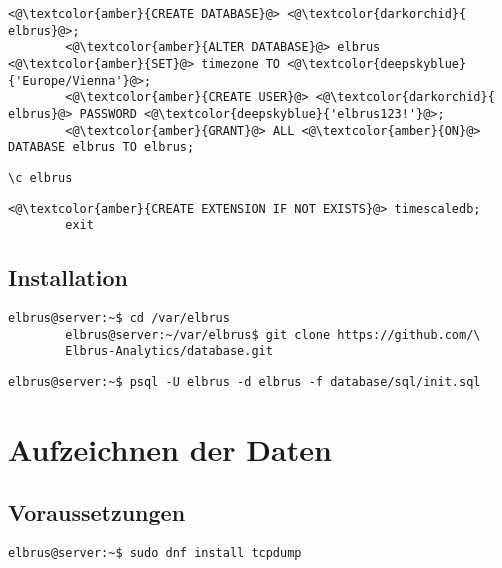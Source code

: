 \documentclass{article}
\begin{document}
	\lstset{style=files}
	\begin{lstlisting}[caption={Auführen von SQL Befehlen.}, numbers=none]
		<@\textcolor{amber}{CREATE DATABASE}@> <@\textcolor{darkorchid}{ elbrus}@>;
		<@\textcolor{amber}{ALTER DATABASE}@> elbrus <@\textcolor{amber}{SET}@> timezone TO <@\textcolor{deepskyblue}{'Europe/Vienna'}@>;
		<@\textcolor{amber}{CREATE USER}@> <@\textcolor{darkorchid}{ elbrus}@> PASSWORD <@\textcolor{deepskyblue}{'elbrus123!'}@>;
		<@\textcolor{amber}{GRANT}@> ALL <@\textcolor{amber}{ON}@> DATABASE elbrus TO elbrus;
	\end{lstlisting}
	
	\begin{lstlisting}[caption={Wechseln zu erstellter Datenbank}, numbers=none]
		\c elbrus
	\end{lstlisting}

	\begin{lstlisting}[caption={Hinzufügen der TimescaleDB Erweiterung.}, numbers=none]
		<@\textcolor{amber}{CREATE EXTENSION IF NOT EXISTS}@> timescaledb;
		exit
	\end{lstlisting}

	\newpage
	\subsection{Installation}
	\lstset{style=commands}
	\begin{lstlisting}[caption={Clonen der Software von GitHub.}]
		elbrus@server:~$ cd /var/elbrus
		elbrus@server:~/var/elbrus$ git clone https://github.com/\
		Elbrus-Analytics/database.git
	\end{lstlisting}

	\begin{lstlisting}[caption={Anlegen der benötigten Tabellen duch das ausführen von 'init.sql'.}]
		elbrus@server:~$ psql -U elbrus -d elbrus -f database/sql/init.sql
	\end{lstlisting}
	
	\newpage
	
	\section{Aufzeichnen der Daten}
	\subsection{Voraussetzungen}
	\lstset{style=commands}
	\begin{lstlisting}[caption={Installieren von 'tcpdump' für das aufzeichnen von Daten.}]
		elbrus@server:~$ sudo dnf install tcpdump
	\end{lstlisting}
\end{document}
